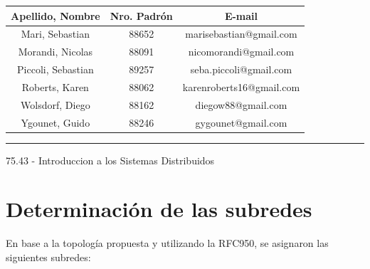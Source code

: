 \documentclass[12pt,titlepage]{article}
\begin{document}
\begin{titlepage}
\begin{center}
\large\addtolength{\tabcolsep}{-3pt}
\begin{tabular}{|| c | c | c ||}
  \hline
    \textbf{Apellido, Nombre} & \textbf{Nro. Padrón} & \textbf{E-mail} \\
  \hline
    Mari, Sebastian & 88652 & marisebastian@gmail.com \\
  \hline
    Morandi, Nicolas & 88091 & nicomorandi@gmail.com \\
  \hline
    Piccoli, Sebastian & 89257 & seba.piccoli@gmail.com \\
  \hline
    Roberts, Karen & 88062 & karenroberts16@gmail.com \\
  \hline
    Wolsdorf, Diego & 88162 & diegow88@gmail.com \\
  \hline
    Ygounet, Guido & 88246 & gygounet@gmail.com \\
  \hline
\end{tabular}
\end{center}

\vfill

\hrule
\vspace{0.2cm}

\noindent\small{75.43 - Introduccion a los Sistemas Distribuidos}

\end{titlepage}



\setcounter{page}{1}

\tableofcontents
\newpage



\section{Determinación de las subredes}

En base a la topolog\'ia propuesta y utilizando la RFC950, se asignaron las siguientes subredes:
\end{document}
